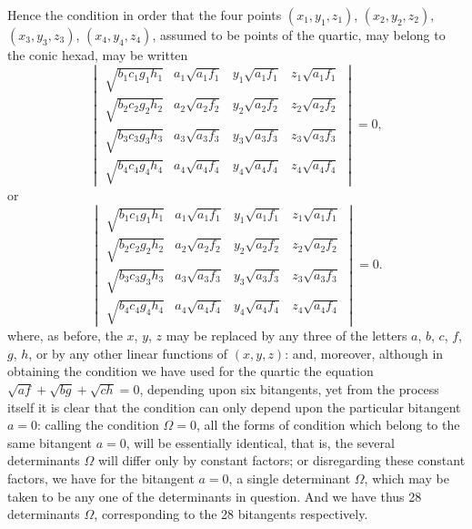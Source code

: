 \documentclass[11pt,a4paper]{book}
\begin{document}
\clearpage
Hence the condition in order that the four points $(x_1, y_1, z_1)$, $(x_2, y_2, z_2)$, $(x_3, y_3, z_3)$, $(x_4, y_4, z_4)$, assumed to be points of the quartic, may belong to the conic hexad, may be written
\[
\begin{vmatrix}
\sqrt{b_1c_1g_1h_1} & a_1\sqrt{a_1f_1} & y_1\sqrt{a_1f_1} & z_1\sqrt{a_1f_1} \\
\sqrt{b_2c_2g_2h_2} & a_2\sqrt{a_2f_2} & y_2\sqrt{a_2f_2} & z_2\sqrt{a_2f_2} \\
\sqrt{b_3c_3g_3h_3} & a_3\sqrt{a_3f_3} & y_3\sqrt{a_3f_3} & z_3\sqrt{a_3f_3} \\
\sqrt{b_4c_4g_4h_4} & a_4\sqrt{a_4f_4} & y_4\sqrt{a_4f_4} & z_4\sqrt{a_4f_4}
\end{vmatrix}
= 0,
\]
or
\[
\begin{vmatrix}
\sqrt{b_1c_1g_1h_1} & a_1\sqrt{a_1f_1} & y_1\sqrt{a_1f_1} & z_1\sqrt{a_1f_1} \\
\sqrt{b_2c_2g_2h_2} & a_2\sqrt{a_2f_2} & y_2\sqrt{a_2f_2} & z_2\sqrt{a_2f_2} \\
\sqrt{b_3c_3g_3h_3} & a_3\sqrt{a_3f_3} & y_3\sqrt{a_3f_3} & z_3\sqrt{a_3f_3} \\
\sqrt{b_4c_4g_4h_4} & a_4\sqrt{a_4f_4} & y_4\sqrt{a_4f_4} & z_4\sqrt{a_4f_4}
\end{vmatrix}
= 0.
\]
where, as before, the $x$, $y$, $z$ may be replaced by any three of the letters $a$, $b$, $c$, $f$, $g$, $h$, or by any other linear functions of $(x, y, z)$: and, moreover, although in obtaining the condition we have used for the quartic the equation $\sqrt{af} + \sqrt{bg} + \sqrt{ch} = 0$, depending upon six bitangents, yet from the process itself it is clear that the condition can only depend upon the particular bitangent $a = 0$: calling the condition $\Omega = 0$, all the forms of condition which belong to the same bitangent $a = 0$, will be essentially identical, that is, the several determinants $\Omega$ will differ only by constant factors; or disregarding these constant factors, we have for the bitangent $a = 0$, a single determinant $\Omega$, which may be taken to be any one of the determinants in question. And we have thus 28 determinants $\Omega$, corresponding to the 28 bitangents respectively.
\end{document}
